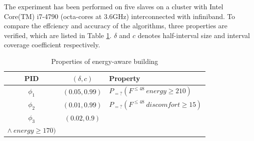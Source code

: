 \begin{figure}[htbp]
\end{figure}

The experiment has been performed on five slaves on a cluster with Intel Core(TM) i7-4790 (octa-cores at 3.6GHz) interconnected with infiniband. To compare the effciency and accuracy of the algorithms, three properties are verified, which are listed in Table \ref{tb:property}. $\delta$ and $c$ denotes half-interval size and interval coverage coefficient respectively.

\begin{table}[t]
	\renewcommand{\arraystretch}{1.2}
	\caption{Properties of energy-aware building}
	\label{tb:property}
	\centering
	\begin{tabular}{c c l}
		\hline
		~PID~ & $(\delta,c)$ & Property\\
		\hline
		$\phi_1$ & $(0.05,0.99)$ & $P_{=?}(F^{\leq48}~energy \geq 210)$ \\ 
		$\phi_2$ & $(0.01,0.99)$ & $P_{=?}(F^{\leq48}~discomfort \geq 15)$ \\
		$\phi_3$ & $(0.02,0.9)$ & 
		\tabincell{c}{$P_{=?}(F^{\leq48}~ discomfort \leq 15$ \\ $\wedge~energy \geq 170)$} \\
		\hline
	\end{tabular}
\end{table}

